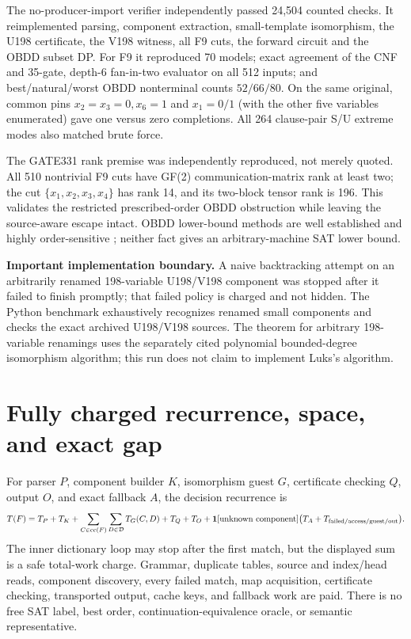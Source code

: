 \documentclass[11pt]{article}
\begin{document}
The no-producer-import verifier independently passed 24,504 counted checks.
It reimplemented parsing, component extraction, small-template isomorphism,
the U198 certificate, the V198 witness, all F9 cuts, the forward circuit and
the OBDD subset DP.  For F9 it reproduced 70 models; exact agreement of the
CNF and 35-gate, depth-6 fan-in-two evaluator on all 512 inputs; and
best/natural/worst OBDD nonterminal counts $52/66/80$.  On the same original,
common pins $x_2=x_3=0,x_6=1$ and $x_1=0/1$ (with the other five variables
enumerated) gave one versus zero completions.  All 264 clause-pair S/U extreme
modes also matched brute force.

The GATE331 rank premise was independently reproduced, not merely quoted.  All
510 nontrivial F9 cuts have GF(2) communication-matrix rank at least two; the
cut $\{x_1,x_2,x_3,x_4\}$ has rank 14, and its two-block tensor rank is 196.
This validates the restricted prescribed-order OBDD obstruction while leaving
the source-aware escape intact.  OBDD lower-bound methods are well established
and highly order-sensitive \cite{krause1999,buss2021}; neither fact gives an
arbitrary-machine SAT lower bound.

\textbf{Important implementation boundary.}  A naive backtracking attempt on
an arbitrarily renamed 198-variable U198/V198 component was stopped after it
failed to finish promptly; that failed policy is charged and not hidden.  The
Python benchmark exhaustively recognizes renamed small components and checks
the exact archived U198/V198 sources.  The theorem for arbitrary 198-variable
renamings uses the separately cited polynomial bounded-degree isomorphism
algorithm; this run does not claim to implement Luks's algorithm.

\section{Fully charged recurrence, space, and exact gap}
For parser $P$, component builder $K$, isomorphism guest $G$, certificate
checking $Q$, output $O$, and exact fallback $A$, the decision recurrence is
\[
 T(F)=T_P+T_K+
 \sum_{C\in\mathrm{cc}(F)}\sum_{D\in\mathcal D}T_G(C,D)
 +T_Q+T_O+
 \mathbf 1[\text{unknown component}]\bigl(T_A+T_{\rm failed/access/guest/out}\bigr).
\]
The inner dictionary loop may stop after the first match, but the displayed
sum is a safe total-work charge.  Grammar, duplicate tables, source and
index/head reads, component discovery, every failed match, map acquisition,
certificate checking, transported output, cache keys, and fallback work are
paid.  There is no free SAT label, best order, continuation-equivalence oracle,
or semantic representative.
\end{document}
